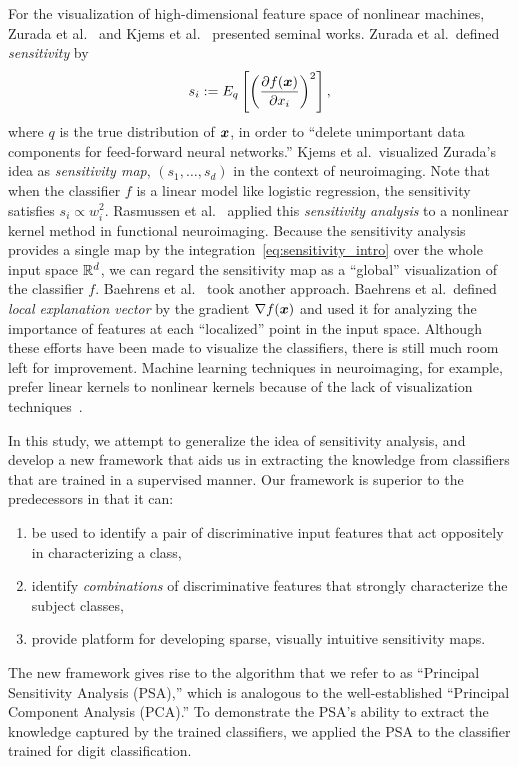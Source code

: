 For the visualization of high-dimensional feature space of nonlinear machines,
Zurada et al.~\cite{Zurada1994,Zurada1997} and Kjems et al.~\cite{Kjems2002}
presented seminal works.
%
Zurada et al.\ defined \textit{sensitivity} by
\begin{equation}
 \label{eq:sensitivity_intro}
 s_i := E_q \left[ \left(\frac{\partial f(\mbox{\boldmath $x$})}{\partial x_i} \right)^2 \right],
\end{equation}
where $q$ is the true distribution of $\mbox{\boldmath $x$}$,
in order to ``delete unimportant data components for feed-forward neural networks.''
Kjems et al.\ visualized Zurada's idea as \textit{sensitivity map}, $\left(s_1, \dots, s_d\right)$
in the context of neuroimaging.
%
Note that when the classifier $f$ is a linear model like logistic
regression, the sensitivity satisfies $s_i \propto w_i^2$.
%
Rasmussen et al.~\cite{Rasmussen2011} applied this \textit{sensitivity analysis}
to a nonlinear kernel method in functional neuroimaging.
%
Because the sensitivity analysis provides a single map by the
integration~\eqref{eq:sensitivity_intro} over the
whole input space $\mathbb{R}^{d}$, we can regard the sensitivity map as a
``global'' visualization of the classifier $f$.
%
Baehrens et al.~\cite{Baehrens2010} took another approach.
%
Baehrens et al.\ defined \textit{local explanation vector} by the
gradient $\nabla f (\mbox{\boldmath $x$})$ and used it for
analyzing the importance of features at each ``localized'' point in the
input space.
%
Although these efforts have been made to visualize the
classifiers,
there is still much room left for improvement.
%
Machine learning techniques in neuroimaging, for example,
prefer linear kernels to nonlinear kernels because of the lack of
visualization techniques~\cite{LaConte2005}.

In this study, we attempt to  generalize the idea of sensitivity
analysis, and develop a new framework that aids us in extracting the
knowledge from classifiers that are trained in a supervised manner.
%
Our framework is superior to the predecessors in that it can:
\begin{enumerate}
 \item be used to identify a pair of discriminative input
       features that act oppositely in characterizing a class,
 \item identify \textit{combinations} of discriminative features that strongly
       characterize the subject classes,
 \item provide platform for developing sparse, visually intuitive
       sensitivity maps.
\end{enumerate}
%
The new framework gives rise to the algorithm that we refer
to as ``Principal Sensitivity Analysis (PSA),'' which is analogous to
the well-established ``Principal Component Analysis (PCA).''
%
To demonstrate the PSA's ability to extract the knowledge captured by
the trained classifiers, we applied the PSA to the classifier trained
for digit classification.

